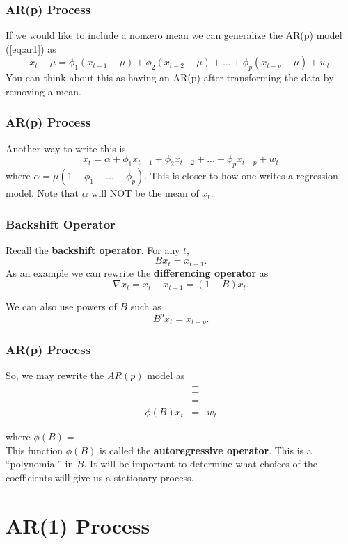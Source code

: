 \documentclass[%
xcolor=pdftex]{beamer}
\begin{document}
\begin{frame}
\frametitle{AR(p) Process}

If we would like to include a nonzero mean we can generalize the AR(p) model (\ref{eq:ar1}) as
$$
x_t-\mu =\phi_1 (x_{t-1}-\mu)+ \phi_2 (x_{t-2}-\mu)+...+  \phi_p (x_{t-p}-\mu) + w_t.
$$
You can think about this as having an AR(p) after transforming the data by removing a mean.

\end{frame}

\begin{frame}
\frametitle{AR(p) Process}

Another way to write this is
$$
x_t=\alpha+\phi_1 x_{t-1} + \phi_2 x_{t-2} +...+  \phi_p x_{t-p} + w_t
$$
where $\alpha=\mu(1-\phi_1-...-\phi_p)$.  This is closer to how one writes a regression model.  Note that $\alpha$ will NOT be the mean of $x_t$.

\end{frame}


\begin{frame}
\frametitle{Backshift Operator}

Recall the \textbf{backshift operator}.  For any $t$,
$$
B x_t =x_{t-1}.
$$
As an example we can rewrite the \textbf{differencing operator} as
$$
\nabla x_t =x_t-x_{t-1}=(1-B)x_{t}.
$$

We can also use powers of $B$ such as
$$
B^p x_t = x_{t-p}.
$$

\end{frame}

\begin{frame}
\frametitle{AR(p) Process}

So, we may rewrite the $AR(p)$ model as
\begin{eqnarray} \label{eq:ar_op}
 & =&  \nonumber \\
 & =&  \nonumber \\
 & =&     \nonumber \\
\phi(B) x_t & =&    w_t
\end{eqnarray}

where $\phi(B)=$ \\
\vspace{5mm}
This function $\phi(B)$ is called the \textbf{autoregressive operator}.  This is a ``polynomial'' in $B$.  It will be important to determine what choices of the coefficients will give us a stationary process.

\end{frame}


\section{AR(1) Process}
\frame{\tableofcontents[currentsection]}
\end{document}
